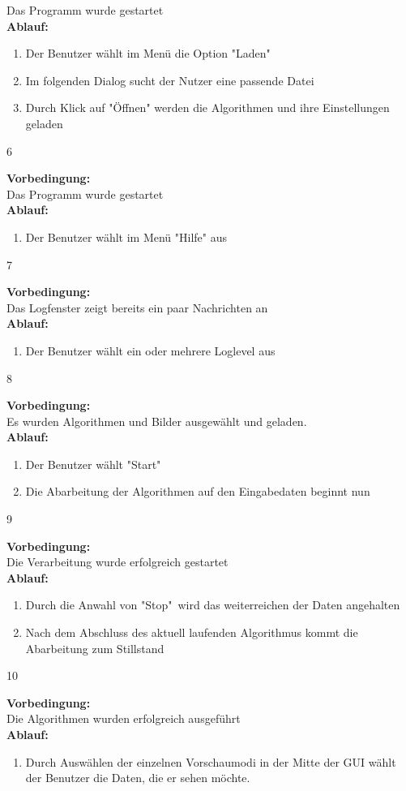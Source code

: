 {{{			Das Programm wurde gestartet
			\\\textbf{Ablauf:}
			\begin{enumerate}
				\item Der Benutzer wählt im Menü die Option "{}Laden"
				\item Im folgenden Dialog sucht der Nutzer eine passende Datei
				\item Durch Klick auf "{}Öffnen" werden die Algorithmen und ihre Einstellungen geladen
			\end{enumerate}
		}
		{6}{
			\textbf{Vorbedingung:}\\
			Das Programm wurde gestartet
			\\\textbf{Ablauf:}
			\begin{enumerate}
				\item Der Benutzer wählt im Menü "{}Hilfe" aus
			\end{enumerate}
		}
		{7}{
			\textbf{Vorbedingung:}\\
			Das Logfenster zeigt bereits ein paar Nachrichten an
			\\\textbf{Ablauf:}
			\begin{enumerate}
				\item Der Benutzer wählt ein oder mehrere Loglevel aus
			\end{enumerate}
		}
		{8}{
			\textbf{Vorbedingung:}\\
			Es wurden Algorithmen und Bilder ausgewählt und geladen.
			\\\textbf{Ablauf:}
			\begin{enumerate}
				\item Der Benutzer wählt "{}Start"
				\item Die Abarbeitung der Algorithmen auf den Eingabedaten beginnt nun
			\end{enumerate}
		}
		{9}{
			\textbf{Vorbedingung:}\\
			Die Verarbeitung wurde erfolgreich gestartet
			\\\textbf{Ablauf:}
			\begin{enumerate}
				\item Durch die Anwahl von "{}Stop" wird das weiterreichen der Daten angehalten
				\item Nach dem Abschluss des aktuell laufenden Algorithmus kommt die Abarbeitung zum Stillstand
			\end{enumerate}
		}
		{10}{
			\textbf{Vorbedingung:}\\
			Die Algorithmen wurden erfolgreich ausgeführt
			\\\textbf{Ablauf:}
			\begin{enumerate}
				\item Durch Auswählen der einzelnen Vorschaumodi in der Mitte der GUI wählt der Benutzer die Daten, die er sehen möchte.
			\end{enumerate}
		}
	}	
}

\newcommand{\fehler}[3]{
\textbf{Fehler: }#1\newline
\textbf{Grund: }#2\newline
\textbf{Behebung: }#3\newline
}